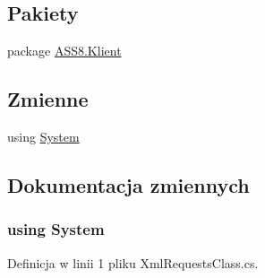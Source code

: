 \subsection*{Pakiety}
\begin{CompactItemize}
\item 
package \hyperlink{a00060}{ASS8.Klient}
\end{CompactItemize}
\subsection*{Zmienne}
\begin{CompactItemize}
\item 
﻿using \hyperlink{a00055_81a223a02c34d82b47199f08308847f2}{System}
\end{CompactItemize}


\subsection{Dokumentacja zmiennych}
\hypertarget{a00055_81a223a02c34d82b47199f08308847f2}{
\subsubsection[{System}]{\setlength{\rightskip}{0pt plus 5cm}﻿using {\bf System}}}
\label{d4/d6d/a00055_81a223a02c34d82b47199f08308847f2}




Definicja w linii 1 pliku XmlRequestsClass.cs.